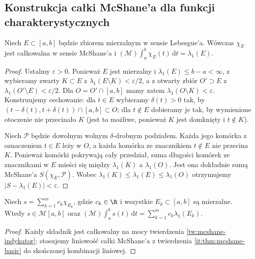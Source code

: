 \subsection*{Konstrukcja całki McShane'a dla funkcji charakterystycznych}
\begin{twierdzenie}\label{tw:mcshane-indykator}
Niech $E\subset[a,b]$ będzie zbiorem mierzalnym w sensie Lebesgue'a. Wówczas $\chi_E$ jest całkowalna w sensie McShane'a i
$(\mathcal M)\int_a^b\chi_E(t)\,\mathrm dt=\lambda_1(E)$.
\end{twierdzenie}
\begin{proof}
Ustalmy $\varepsilon>0$. Ponieważ $E$ jest mierzalny i $\lambda_1(E)\le b-a<\infty$, z
wybieramy zwarty $K\subset E$ z $\lambda_1(E\setminus K)<\varepsilon/2$,
a z 
otwarty zbiór $O'\supset E$ z $\lambda_1(O'\setminus E)<\varepsilon/2$.
Dla $O=O'\cap[a,b]$ mamy zatem $\lambda_1(O\setminus K)<\varepsilon$. Konstruujemy cechowanie: dla $t\in E$ wybieramy $\delta(t)>0$ tak, by $(t-\delta(t),t+\delta(t))\cap[a,b]\subset O$; dla $t\notin E$ dobieramy je tak, by wymienione otoczenie nie przecinało $K$ (jest to możliwe, ponieważ $K$ jest domknięty i $t\notin K$).

Niech $\mathcal P$ będzie dowolnym wolnym $\delta$-drobnym podziałem. Każda jego komórka z oznaczeniem $t\in E$ leży w $O$, a każda komórka ze znacznikiem $t\notin E$ nie przecina $K$. Ponieważ komórki pokrywają cały przedział, suma długości komórek ze znacznikami w $E$ mieści się między $\lambda_1(K)$ a $\lambda_1(O)$. Jest ona dokładnie sumą McShane'a $S(\chi_E,\mathcal P)$. Wobec $\lambda_1(K)\le\lambda_1(E)\le\lambda_1(O)$ otrzymujemy $|S-\lambda_1(E)|<\varepsilon$.
\end{proof}
\begin{wniosek}\label{wn:mcshane-proste}
Niech $s=\sum_{k=1}^m c_k\chi_{E_k}$, gdzie $c_k\in\R$ i wszystkie $E_k\subset[a,b]$ są mierzalne. Wtedy $s\in\mathcal M[a,b]$ oraz $(\mathcal M)\int_a^b s(t)\,\mathrm dt=\sum_{k=1}^m c_k\lambda_1(E_k)$.
\end{wniosek}
\begin{proof}
Każdy składnik jest całkowalny na mocy twierdzenia \ref{tw:mcshane-indykator}; stosujemy liniowość całki McShane'a z twierdzenia \ref{it:thm:mcshane-basic} do skończonej kombinacji liniowej.
\end{proof}
